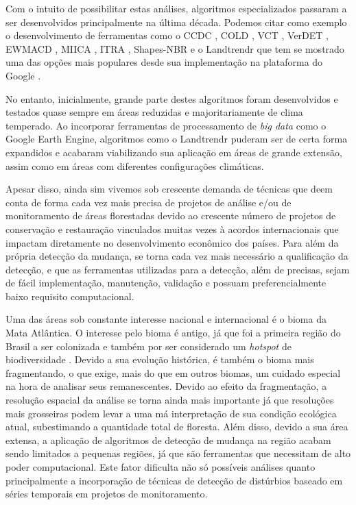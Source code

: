 Com o intuito de possibilitar estas análises, algoritmos especializados passaram a ser desenvolvidos principalmente na última década. Podemos citar como exemplo o desenvolvimento de ferramentas como o CCDC \citep{ZHU2014152}, COLD \citep{Cohen2020}, VCT \citep{Huang2010, THOMAS201119} , VerDET \citep{Hughes2017}, EWMACD \citep{Brooks2014}, MIICA \citep{JIN2013159}, ITRA \citep{VOGELMANN201292}, Shapes-NBR \citep{Meyer2013, Moisen2016} e o Landtrendr \citep{KENNEDY20102897, KENNEDY2012117} que tem se mostrado uma das opções mais populares desde sua implementação na plataforma do Google \citep{Kennedy2018}.

No entanto, inicialmente, grande parte destes algoritmos foram desenvolvidos e testados quase sempre em áreas reduzidas e majoritariamente de clima temperado. Ao incorporar ferramentas de processamento de \textit{big data} como o Google Earth Engine, algoritmos como o Landtrendr puderam ser de certa forma expandidos e acabaram viabilizando sua aplicação em áreas de grande extensão, assim como em áreas com diferentes configurações climáticas.

Apesar disso, ainda sim vivemos sob crescente demanda de técnicas que deem conta de forma cada vez mais precisa de projetos de análise e/ou de monitoramento de áreas florestadas devido ao crescente número de projetos de conservação e restauração vinculados muitas vezes à acordos internacionais que impactam diretamente no desenvolvimento econômico dos países. Para além da própria detecção da mudança, se torna cada vez mais necessário a qualificação da detecção, e que as ferramentas utilizadas para a detecção, além de precisas, sejam de fácil implementação, manutenção, validação e possuam preferencialmente baixo requisito computacional.

Uma das áreas sob constante interesse nacional e internacional é o bioma da Mata Atlântica. O interesse pelo bioma é antigo, já que foi a primeira região do Brasil a ser colonizada e também por ser considerado um \textit{hotspot} de biodiversidade \citep{REZENDE2018208}. Devido a sua evolução histórica, é também o bioma mais fragmentando, o que exige, mais do que em outros biomas, um cuidado especial na hora de analisar seus remanescentes. Devido ao efeito da fragmentação, a resolução espacial da análise se torna ainda mais importante já que resoluções mais grosseiras podem levar a uma má interpretação de sua condição ecológica atual, subestimando a quantidade total de floresta. Além disso, devido a sua área extensa, a aplicação de algoritmos de detecção de mudança na região acabam sendo limitados a pequenas regiões, já que são ferramentas que necessitam de alto poder computacional. Este fator dificulta não só possíveis análises quanto principalmente a incorporação de técnicas de detecção de distúrbios baseado em séries temporais em projetos de monitoramento.

